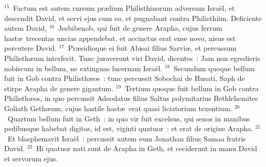 ${}^{15}$~Factum est autem rursum pr\ae lium Philisthinorum adversum Isra\"el, et descendit David, et servi ejus cum eo, et pugnabant contra Philisthiim. Deficiente autem David,
${}^{16}$~Jesbibenob, qui fuit de genere Arapha, cujus ferrum hast\ae\ trecentas uncias appendebat, et accinctus erat ense novo, nisus est percutere David.
${}^{17}$~Pr\ae sidioque ei fuit Abisai filius Sarvi\ae , et percussum Philisth\ae um interfecit. Tunc juraverunt viri David, dicentes~: Jam non egredieris nobiscum in bellum, ne extinguas lucernam Isra\"el.
${}^{18}$~Secundum quoque bellum fuit in Gob contra Philisth\ae os~: tunc percussit Sobochai de Husati, Saph de stirpe Arapha de genere gigantum.
${}^{19}$~Tertium quoque fuit bellum in Gob contra Philisth\ae os, in quo percussit Adeodatus filius Saltus polymitarius Bethlehemites Goliath Geth\ae um, cujus hastile hast\ae\ erat quasi liciatorium texentium.
${}^{20}$~Quartum bellum fuit in Geth~: in quo vir fuit excelsus, qui senos in manibus pedibusque habebat digitos, id est, viginti quatuor~: et erat de origine Arapha.
${}^{21}$~Et blasphemavit Isra\"el~: percussit autem eum Jonathan filius Samaa fratris David.
${}^{22}$~Hi quatuor nati sunt de Arapha in Geth, et ceciderunt in manu David et servorum ejus.

